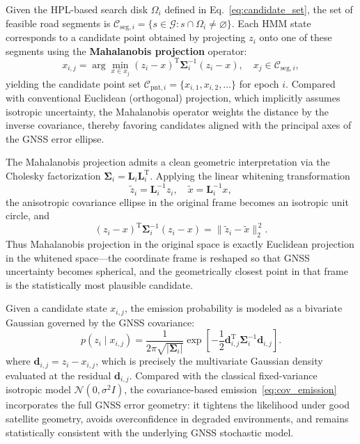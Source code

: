 \documentclass[letterpaper,journal]{IEEEtran}
\begin{document}
Given the HPL-based search disk $\Omega_i$ defined in Eq.~\eqref{eq:candidate_set}, the set of feasible road segments is $\mathcal{C}_{\mathrm{seg},i} = \{ s \in \mathcal{G} : s \cap \Omega_i \neq \varnothing \}$. Each HMM state corresponds to a candidate point obtained by projecting $z_i$ onto one of these segments using the \textbf{Mahalanobis projection} operator:
\begin{equation}
x_{i,j}
=
\arg\min_{x \in x_j}
\left( z_i - x \right)^{\mathrm{T}}
\boldsymbol{\Sigma}_i^{-1}
\left( z_i - x \right),
\quad
x_j \in \mathcal{C}_{\mathrm{seg},i},
\label{eq:ma_project}
\end{equation}
yielding the candidate point set $\mathcal{C}_{\mathrm{pnt},i} = \{ x_{i,1}, x_{i,2}, \ldots \}$ for epoch $i$. Compared with conventional Euclidean (orthogonal) projection, which implicitly assumes isotropic uncertainty, the Mahalanobis operator weights the distance by the inverse covariance, thereby favoring candidates aligned with the principal axes of the GNSS error ellipse.

The Mahalanobis projection admits a clean geometric interpretation via the Cholesky factorization $\boldsymbol{\Sigma}_i = \mathbf{L}_i \mathbf{L}_i^{\mathrm{T}}$. Applying the linear whitening transformation
\begin{equation}
\tilde{z}_i = \mathbf{L}_i^{-1} z_i,
\quad
\tilde{x} = \mathbf{L}_i^{-1} x,
\end{equation}
the anisotropic covariance ellipse in the original frame becomes an isotropic unit circle, and
\begin{equation}
\left(z_i - x\right)^{\mathrm{T}} \boldsymbol{\Sigma}_i^{-1} \left(z_i - x\right)
= \|\tilde{z}_i - \tilde{x}\|_2^{\,2}.
\end{equation}
Thus Mahalanobis projection in the original space is exactly Euclidean projection in the whitened space---the coordinate frame is reshaped so that GNSS uncertainty becomes spherical, and the geometrically closest point in that frame is the statistically most plausible candidate.

Given a candidate state $x_{i,j}$, the emission probability is modeled as a bivariate Gaussian governed by the GNSS covariance:
\begin{equation}
p(z_i \mid x_{i,j})
=
\frac{1}{2\pi \sqrt{|\boldsymbol{\Sigma}_i|}}
\exp\!\left[
-\frac{1}{2}
\mathbf{d}_{i,j}^{\mathrm{T}}
\boldsymbol{\Sigma}_i^{-1}
\mathbf{d}_{i,j}
\right].
\label{eq:cov_emission}
\end{equation}
where $\mathbf{d}_{i,j} = z_i - x_{i,j}$, which is precisely the multivariate Gaussian density evaluated at the residual $\mathbf{d}_{i,j}$. Compared with the classical fixed-variance isotropic model $\mathcal{N}(0,\sigma^2 I)$, the covariance-based emission~\eqref{eq:cov_emission} incorporates the full GNSS error geometry: it tightens the likelihood under good satellite geometry, avoids overconfidence in degraded environments, and remains statistically consistent with the underlying GNSS stochastic model.
\end{document}
